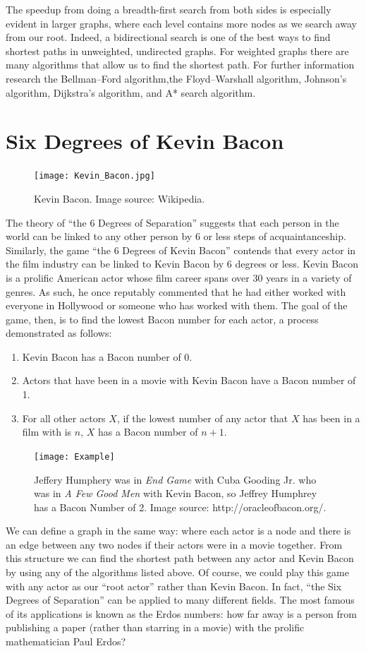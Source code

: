 The speedup from doing a breadth-first search from both sides is especially evident in larger graphs, where each level
contains more nodes as we search away from our root. Indeed, a bidirectional search is one of the best ways to find shortest
paths in unweighted, undirected graphs. For weighted graphs there are many algorithms that allow us to find the shortest path. For further information research
the Bellman–Ford algorithm,the Floyd–Warshall algorithm, Johnson's algorithm, Dijkstra's algorithm, and A* search algorithm.

\section*{Six Degrees of Kevin Bacon}
\begin{figure}[h]
\texttt{[image: Kevin\_Bacon.jpg]}
\caption{Kevin Bacon.  Image source: Wikipedia.}
\end{figure}

The theory of ``the 6 Degrees of Separation'' suggests that each person in the world can be linked to any other person by 6 or less steps of acquaintanceship.
Similarly, the game ``the 6 Degrees of Kevin Bacon'' contends that every actor in the film industry can be linked to Kevin Bacon by 6 degrees or less. Kevin Bacon
is a prolific American actor whose film career spans over 30 years in a variety of genres. As such, he once reputably commented that he had either worked with everyone in
Hollywood or someone who has worked with them. The goal of the game, then, is to find the lowest Bacon number for each actor, a process demonstrated as follows:
\begin{enumerate}
\item Kevin Bacon has a Bacon number of 0.
\item Actors that have been in a movie with Kevin Bacon have a Bacon number of 1.
\item For all other actors $X$, if the lowest number of any actor that $X$ has been in a film with is $n$, $X$ has a Bacon number of $n+1$.
\end{enumerate}

\begin{figure}[h]
\texttt{[image: Example]}
\caption{Jeffery Humphery was in \emph{End Game} with Cuba Gooding Jr. who was in \emph{A Few Good Men} with Kevin Bacon, so Jeffrey Humphrey has a Bacon Number of 2.  Image source: http://oracleofbacon.org/.}
\end{figure}

We can define a graph in the same way: where each actor is a node and there is an edge between any two nodes if their actors were in a movie together. From this structure we can find
the shortest path between any actor and Kevin Bacon by using any of the algorithms listed above. Of course, we could play this game with any actor as our ``root actor'' rather than Kevin Bacon. In
fact, ``the Six Degrees of Separation'' can be applied to many different fields. The most famous of its applications is known as the Erdos numbers: how far away is a person
 from publishing a paper (rather than starring in a movie) with the prolific mathematician Paul Erdos?

